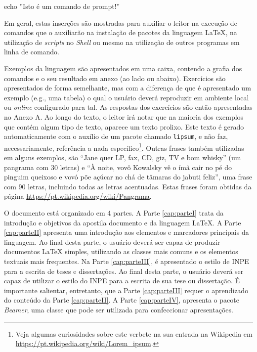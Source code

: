 \begin{meucomando}
echo ''Isto é um comando de prompt!''
\end{meucomando}

Em geral, estas inserções são mostradas para auxiliar o leitor na execução de comandos que o auxiliarão na instalação de pacotes da linguagem \LaTeX{}, na utilização de \textit{scripts} no \textit{Shell} ou mesmo na utilização de outros programas em linha de comando.

Exemplos da linguagem são apresentados em uma caixa, contendo a grafia dos comandos e o seu resultado em anexo (ao lado ou abaixo). Exercícios são apresentados de forma semelhante, mas com a diferença de que é apresentado um exemplo (e.g., uma tabela) o qual o usuário deverá reproduzir em ambiente local ou \textit{online} configurado para tal. As respostas dos exercícios são então apresentadas no Anexo A. Ao longo do texto, o leitor irá notar que na maioria dos exemplos que contém algum tipo de texto, aparece um texto prolixo. Este texto é gerado automaticamente com o auxílio de um pacote chamado {\tt lipsum}, e não faz, necessariamente, referência a nada específico\footnote{Veja algumas curiosidades sobre este verbete na sua entrada na Wikipedia em \url{https://pt.wikipedia.org/wiki/Lorem_ipsum}.}. Outras frases também utilizadas em alguns exemplos, são ``Jane quer LP, fax, CD, giz, TV e bom whisky'' (um pangrama com 30 letras) e ``À noite, vovô Kowalsky vê o ímã cair no pé do pinguim queixoso e vovó põe açúcar no chá de tâmaras do jabuti feliz'', uma frase com 90 letras, incluindo todas as letras acentuadas. Estas frases foram obtidas da página \url{https://pt.wikipedia.org/wiki/Pangrama}.

O documento está organizado em 4 partes. A Parte \ref{cap:parteI} trata da introdução e objetivos da apostila documento e da linguagem \LaTeX{}. A Parte \ref{cap:parteII} apresenta uma introdução aos elementos e marcadores principais da linguagem. Ao final desta parte, o usuário deverá ser capaz de produzir documentos \LaTeX{} simples, utilizando as classes mais comuns e os elementos textuais mais frequentes. Na Parte \ref{cap:parteIII}, é apresentado o estilo de INPE para a escrita de teses e dissertações. Ao final desta parte, o usuário deverá ser capaz de utilizar o estilo do INPE para a escrita de sua tese ou dissertação. É importante salientar, entretanto, que a Parte \ref{cap:parteIII} requer o aprendizado do conteúdo da Parte \ref{cap:parteII}. A Parte \ref{cap:parteIV}, apresenta o pacote \textit{Beamer}, uma classe que pode ser utilizada para confeccionar apresentações.

